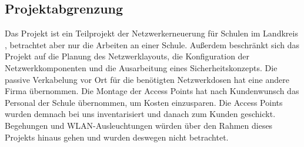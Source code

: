 \subsection{Projektabgrenzung} 
\label{sec:Projektabgrenzung}
Das Projekt ist ein Teilprojekt der Netzwerkerneuerung für Schulen im Landkreis , betrachtet aber nur die Arbeiten an einer Schule. Außerdem beschränkt sich das Projekt auf die Planung des Netzwerklayouts, die Konfiguration der Netzwerkkomponenten und die Ausarbeitung eines Sicherheitskonzepts. Die passive Verkabelung vor Ort für die benötigten Netzwerkdosen hat eine andere Firma übernommen. Die Montage der Access Points hat nach Kundenwunsch das Personal der Schule übernommen, um Kosten einzusparen. Die Access Points wurden demnach bei uns inventarisiert und danach zum Kunden geschickt. Begehungen und WLAN-Ausleuchtungen würden über den Rahmen dieses Projekts hinaus gehen und wurden deswegen nicht betrachtet.
\begin{comment}
	\item Was ist explizit nicht Teil des Projekts (\insb bei Teilprojekten)?
\end{comment}
